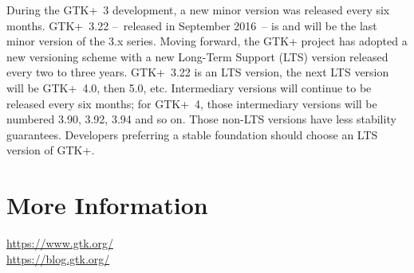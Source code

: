 \documentclass[a4paper,notumble]{leaflet}
\begin{document}
During the GTK+~3 development, a new minor version was released every six months. GTK+~3.22 --~released in September 2016~-- is and will be the last minor version of the 3.x series. Moving forward, the GTK+ project has adopted a new versioning scheme with a new Long-Term Support (LTS) version released every two to three years. GTK+~3.22 is an LTS version, the next LTS version will be GTK+~4.0, then 5.0, etc. Intermediary versions will continue to be released every six months; for GTK+~4, those intermediary versions will be numbered 3.90, 3.92, 3.94 and so on. Those non-LTS versions have less stability guarantees. Developers preferring a stable foundation should choose an LTS version of GTK+.

%
%

\section{More Information}

\url{https://www.gtk.org/}\\
\url{https://blog.gtk.org/}
\end{document}
